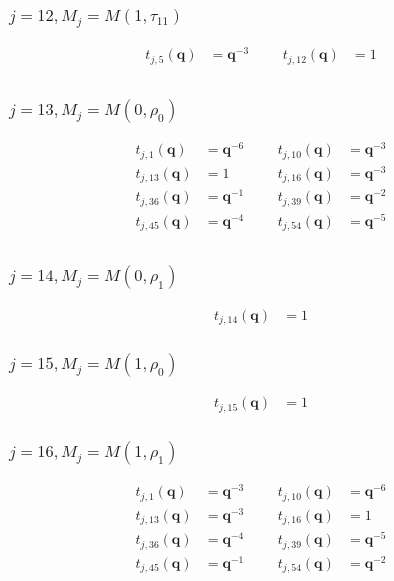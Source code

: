 \subsubsection{$j=12, M_{j}=M(1,\tau_{11})$}
\begin{align*}
t_{j,5}(\boldsymbol{q})&=\boldsymbol{q}^{-3} &&& t_{j,12}(\boldsymbol{q})&=1 \\
\end{align*}

\subsubsection{$j=13, M_{j}=M(0,\rho_{0})$}
\begin{align*}
t_{j,1}(\boldsymbol{q})&=\boldsymbol{q}^{-6} &&& t_{j,10}(\boldsymbol{q})&=\boldsymbol{q}^{-3} \\
t_{j,13}(\boldsymbol{q})&=1 &&& t_{j,16}(\boldsymbol{q})&=\boldsymbol{q}^{-3} \\
t_{j,36}(\boldsymbol{q})&=\boldsymbol{q}^{-1} &&& t_{j,39}(\boldsymbol{q})&=\boldsymbol{q}^{-2} \\
t_{j,45}(\boldsymbol{q})&=\boldsymbol{q}^{-4} &&& t_{j,54}(\boldsymbol{q})&=\boldsymbol{q}^{-5} \\
\end{align*}

\subsubsection{$j=14, M_{j}=M(0,\rho_{1})$}
\begin{align*}
t_{j,14}(\boldsymbol{q})&=1
\end{align*}

\subsubsection{$j=15, M_{j}=M(1,\rho_{0})$}
\begin{align*}
t_{j,15}(\boldsymbol{q})&=1
\end{align*}

\subsubsection{$j=16, M_{j}=M(1,\rho_{1})$}
\begin{align*}
t_{j,1}(\boldsymbol{q})&=\boldsymbol{q}^{-3} &&& t_{j,10}(\boldsymbol{q})&=\boldsymbol{q}^{-6} \\
t_{j,13}(\boldsymbol{q})&=\boldsymbol{q}^{-3} &&& t_{j,16}(\boldsymbol{q})&=1 \\
t_{j,36}(\boldsymbol{q})&=\boldsymbol{q}^{-4} &&& t_{j,39}(\boldsymbol{q})&=\boldsymbol{q}^{-5} \\
t_{j,45}(\boldsymbol{q})&=\boldsymbol{q}^{-1} &&& t_{j,54}(\boldsymbol{q})&=\boldsymbol{q}^{-2} \\
\end{align*}

